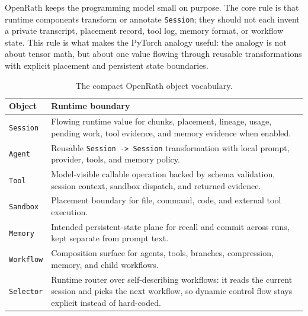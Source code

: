 
OpenRath keeps the programming model small on purpose. The core rule is that
runtime components transform or annotate \texttt{Session}; they should not each
invent a private transcript, placement record, tool log, memory format, or
workflow state. This rule is what makes the PyTorch analogy useful: the analogy
is not about tensor math, but about one value flowing through reusable
transformations with explicit placement and persistent state boundaries.

\begin{table}[H]
\vspace{0.15em}
\centering
\small
\caption{The compact OpenRath object vocabulary.}
\label{tab:programming-model-vocabulary}
\begin{tabularx}{\linewidth}{@{}lX@{}}
\toprule
Object & Runtime boundary \\
\midrule
\texttt{Session} & Flowing runtime value for chunks, placement, lineage, usage, pending work, tool evidence, and memory evidence when enabled. \\
\texttt{Agent} & Reusable \texttt{Session -> Session} transformation with local prompt, provider, tools, and memory policy. \\
\texttt{Tool} & Model-visible callable operation backed by schema validation, session context, sandbox dispatch, and returned evidence. \\
\texttt{Sandbox} & Placement boundary for file, command, code, and external tool execution. \\
\texttt{Memory} & Intended persistent-state plane for recall and commit across runs, kept separate from prompt text. \\
\texttt{Workflow} & Composition surface for agents, tools, branches, compression, memory, and child workflows. \\
\texttt{Selector} & Runtime router over self-describing workflows: it reads the current session and picks the next workflow, so dynamic control flow stays explicit instead of hard-coded. \\
\bottomrule
\end{tabularx}
\vspace{0.15em}
\end{table}

